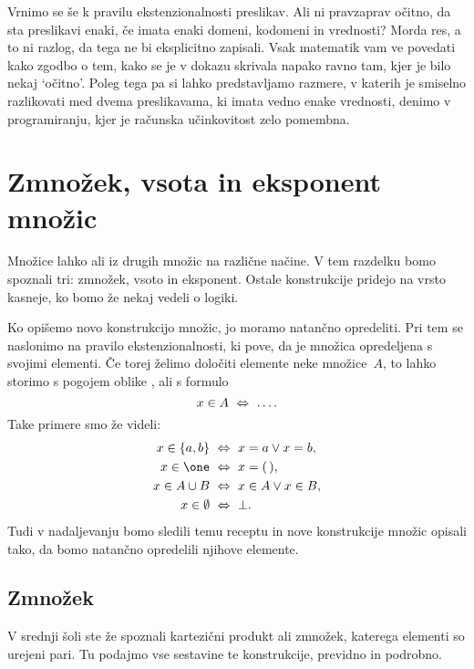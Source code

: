 Vrnimo se še k pravilu ekstenzionalnosti preslikav. Ali ni pravzaprav očitno, da sta
preslikavi enaki, če imata enaki domeni, kodomeni in vrednosti? Morda res, a to ni razlog,
da tega ne bi eksplicitno zapisali. Vsak matematik vam ve povedati kako zgodbo o tem,
kako se je v dokazu skrivala napako ravno tam, kjer je bilo nekaj `očitno'. Poleg tega
pa si lahko predstavljamo razmere, v katerih je smiselno razlikovati med dvema
preslikavama, ki imata vedno enake vrednosti, denimo v programiranju, kjer je računska učinkovitost
zelo pomembna.

\section{Zmnožek, vsota in eksponent množic}

Množice lahko  ali  iz drugih množic na različne načine. V
tem razdelku bomo spoznali tri: zmnožek, vsoto in eksponent.
%
Ostale konstrukcije pridejo na vrsto kasneje, ko bomo že nekaj vedeli o logiki.

Ko opišemo novo konstrukcijo množic, jo moramo natančno opredeliti. Pri tem se naslonimo na pravilo ekstenzionalnosti, ki pove, da je množica opredeljena s svojimi elementi.
%
Če torej želimo določiti elemente neke množice~$A$, to lahko storimo s pogojem oblike
, ali s formulo
%
\begin{equation*}
  x \in A \ \Leftrightarrow\  \ldots.
\end{equation*}
%
Take primere smo že videli:
%
\begin{align*}
  x \in \set{a, b} &\ \liff\  x = a \lor x = b,\\
  x \in \one &\ \liff\  x = \unit,\\
  x \in A \cup B &\ \liff\  x \in A \lor x \in B,\\
  x \in \emptyset &\ \liff\  \bot.
\end{align*}
%
Tudi v nadaljevanju bomo sledili temu receptu in nove konstrukcije množic opisali tako, da bomo natančno opredelili njihove elemente.

\subsection{Zmnožek}
\label{sec:zmnozek}

V srednji šoli ste že spoznali kartezični produkt ali zmnožek, katerega elementi so urejeni pari.
Tu podajmo vse sestavine te konstrukcije, previdno in podrobno.

